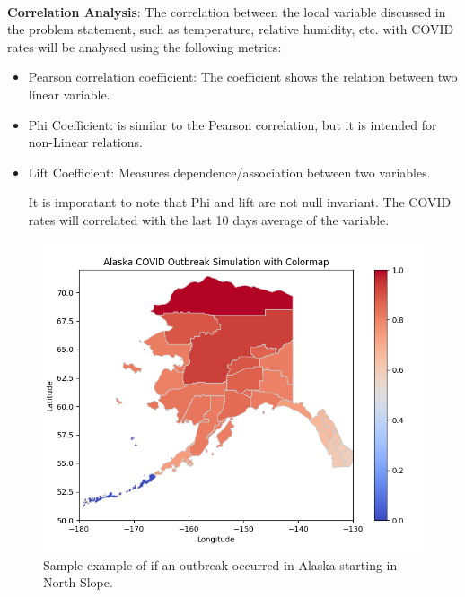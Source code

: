 \documentclass[sigconf,screen,nonacm]{acmart}
\begin{document}
\\
\textbf{Correlation Analysis}: The correlation between the local variable discussed in the problem statement, such as temperature, relative humidity, etc. with COVID rates will be analysed using the following metrics: 
\begin{itemize}

\item Pearson correlation coefficient: The coefficient shows the relation between two linear variable.
\item Phi Coefficient: is similar to the Pearson correlation, but it is intended for non-Linear relations.
\item Lift Coefficient: Measures dependence/association between two variables.

It is imporatant to note that Phi and lift are not null invariant. The COVID rates will correlated with the last 10 days average of the variable.


\end{itemize}

\begin{figure}[h]
  \centering
  \includegraphics[width=\linewidth]{AlaskaOutbreakExamplev2.png}
  \caption{Sample example of if an outbreak occurred in Alaska starting in North Slope.}
\end{figure}
\end{document}
